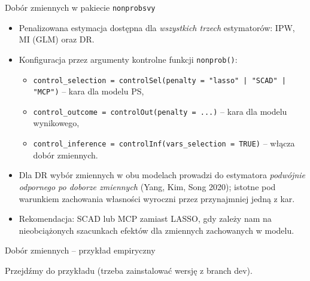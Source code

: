 \documentclass[10pt,ignorenonframetext, aspectratio=169]{beamer}
\begin{document}
\begin{frame}{Dobór zmiennych w pakiecie \texttt{nonprobsvy}}
\begin{itemize}
\justifying
    \item Penalizowana estymacja dostępna dla \emph{wszystkich trzech} estymatorów: IPW, MI (GLM) oraz DR.
    \item Konfiguracja przez argumenty kontrolne funkcji \texttt{nonprob()}:
    \begin{itemize}
        \item \texttt{control\_selection = controlSel(penalty = "lasso" | "SCAD" | "MCP")} -- kara dla modelu PS,
        \item \texttt{control\_outcome = controlOut(penalty = ...)} -- kara dla modelu wynikowego,
        \item \texttt{control\_inference = controlInf(vars\_selection = TRUE)} -- włącza dobór zmiennych.
    \end{itemize}
    \item Dla DR wybór zmiennych w obu modelach prowadzi do estymatora \emph{podwójnie odpornego po doborze zmiennych} (Yang, Kim, Song 2020); istotne pod warunkiem zachowania własności wyroczni przez przynajmniej jedną z kar.
    \item Rekomendacja: SCAD lub MCP zamiast LASSO, gdy zależy nam na nieobciążonych szacunkach efektów dla zmiennych zachowanych w modelu.
\end{itemize}
\end{frame}

\begin{frame}{Dobór zmiennych -- przykład empiryczny}

\begin{center}
Przejdźmy do przykładu  (trzeba zainstalować wersję z branch dev).
\end{center}

\end{frame}
\end{document}
